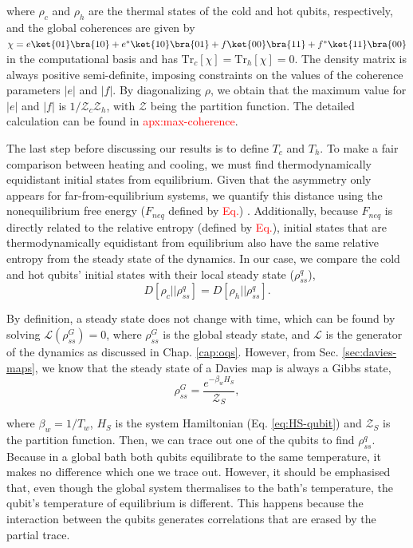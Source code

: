 \noindent where $\rho_c$ and $\rho_h$ are the thermal states of the cold and hot qubits, respectively, and the global coherences are given by $\chi = e \ket{01}\bra{10} + e^* \ket{10}\bra{01} + f \ket{00}\bra{11} + f^* \ket{11}\bra{00}$ in the computational basis and has $\text{Tr}_c[\chi] = \text{Tr}_h[\chi] = 0$. The density matrix is always positive semi-definite, imposing constraints on the values of the coherence parameters $|e|$ and $|f|$. By diagonalizing $\rho$, we obtain that the maximum value for $|e|$ and $|f|$ is $1/\mathcal{Z}_c \mathcal{Z}_h$, with $\mathcal{Z}$ being the partition function. The detailed calculation can be found in \textcolor{red}{apx:max-coherence}.

The last step before discussing our results is to define $T_c$ and $T_h$. To make a fair comparison between heating and cooling, we must find thermodynamically equidistant initial states from equilibrium. Given that the asymmetry only appears for far-from-equilibrium systems, we quantify this distance using the nonequilibrium free energy ($F_{neq}$ defined by \textcolor{red}{Eq.}) \cite{krissia-2024}. Additionally, because $F_{neq}$ is directly related to the relative entropy (defined by \textcolor{red}{Eq.}), initial states that are thermodynamically equidistant from equilibrium also have the same relative entropy from the steady state of the dynamics. In our case, we compare the cold and hot qubits' initial states with their local steady state ($\rho_{ss}^q$),
\begin{equation}
    D[\rho_c || \rho_{ss}^{q}] = D[\rho_h || \rho_{ss}^{q}].
    \label{eq:same-D-qubit}
\end{equation}

\noindent By definition, a steady state does not change with time, which can be found by solving $\mathcal{L}( \rho_{ss}^G) = 0$, where $\rho_{ss}^G$ is the global steady state, and $\mathcal{L}$ is the generator of the dynamics as discussed in Chap. \ref{cap:oqs}. However, from Sec. \ref{sec:davies-maps}, we know that the steady state of a Davies map is always a Gibbs state, 
\begin{equation}
    \rho_{ss}^G = \frac{e^{-\beta_w H_S}}{\mathcal{Z}_S},
\end{equation} 

\noindent where $\beta_w = 1/T_w$, $H_S$ is the system Hamiltonian (Eq. \eqref{eq:HS-qubit}) and $\mathcal{Z}_S$ is the partition function. Then, we can trace out one of the qubits to find $\rho_{ss}^q$. Because in a global bath both qubits equilibrate to the same temperature, it makes no difference which one we trace out. However, it should be emphasised that, even though the global system thermalises to the bath's temperature, the qubit's temperature of equilibrium is different. This happens because the interaction between the qubits generates correlations that are erased by the partial trace.

